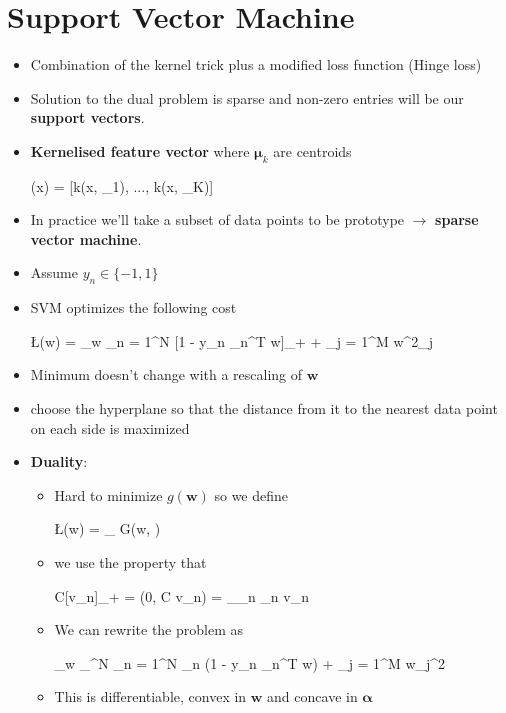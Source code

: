 \section{Support Vector Machine} 
\begin{itemize}
	\item Combination of the kernel trick plus a modified loss function (Hinge loss)
	\item Solution to the dual problem is sparse and non-zero entries will be our \textbf{support vectors}.
	\item \textbf{Kernelised feature vector} where $\bm \mu_k$ are centroids
	\begin{myalign*}
	    \bm \phi(\*x) = [k(\*x, \bm \mu_1), ..., k(\*x, \bm \mu_K)]
	\end{myalign*}
	\item In practice we'll take a subset of data points to be prototype $\rightarrow$ \textbf{sparse vector machine}.
	\item Assume $y_n \in \{-1, 1\}$
	\item SVM optimizes the following cost
	\begin{myalign*}
	    \L(\bm w) = \min_{\bm w} \sum_{n = 1}^N [1 - y_n \tilde{\bm \phi}_n^T \bm w]_+ +  \sum_{j = 1}^M w^2_j
	\end{myalign*}
	\item Minimum doesn't change with a rescaling of $\bm w$
	\item choose the hyperplane so that the distance from it to the nearest data point on each side is maximized
	\item \textbf{Duality}:
	\begin{itemize}
		\item Hard to minimize $g(\bm w)$ so we define
		\begin{myalign*}
		    \L(\bm w) = \max_{\bm \alpha} G(\bm w, \bm \alpha)
		\end{myalign*}
		\item we use the property that
		\begin{myalign*}
		    C[v_n]_+ = \max(0, C v_n) = \max_{\alpha_n \in [0, C]} \alpha_n v_n
		\end{myalign*}
		\item We can rewrite the problem as
		\begin{myalign*}
		    \min_{\bm w} \max_{\bm \alpha \in [0, C]^N} \sum_{n = 1}^N \alpha_n (1 - y_n \bm \phi_n^T \bm w) +  \sum_{j = 1}^M w_j^2
		\end{myalign*}
		\item This is differentiable, convex in $\bm w$ and concave in $\bm \alpha$

\end{itemize}
\end{itemize}

